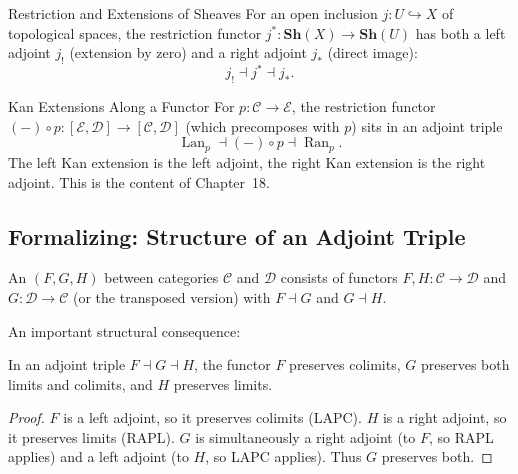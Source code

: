 \begin{example}{Restriction and Extensions of Sheaves}
For an open inclusion $j : U \hookrightarrow X$ of topological spaces, the
restriction functor $j^* : \mathbf{Sh}(X) \to \mathbf{Sh}(U)$ has both a left
adjoint $j_!$ (extension by zero) and a right adjoint $j_*$ (direct image):
\begin{equation*}
  j_! \dashv j^* \dashv j_*.
\end{equation*}
\end{example}

\begin{example}{Kan Extensions Along a Functor}
For $p : \mathcal{C} \to \mathcal{E}$, the restriction functor
$(-) \circ p : [\mathcal{E}, \mathcal{D}] \to [\mathcal{C}, \mathcal{D}]$ (which
precomposes with $p$) sits in an adjoint triple
\begin{equation*}
  \operatorname{Lan}_p \dashv (-) \circ p \dashv \operatorname{Ran}_p.
\end{equation*}
The left Kan extension is the left adjoint, the right Kan extension is the
right adjoint. This is the content of Chapter~18.
\end{example}

\subsection{Formalizing: Structure of an Adjoint Triple}

\begin{definition}
An  $(F, G, H)$ between categories $\mathcal{C}$ and
$\mathcal{D}$ consists of functors $F, H : \mathcal{C} \to \mathcal{D}$ and
$G : \mathcal{D} \to \mathcal{C}$ (or the transposed version) with $F \dashv G$
and $G \dashv H$.
\end{definition}

An important structural consequence:

\begin{proposition}
In an adjoint triple $F \dashv G \dashv H$, the functor $F$ preserves colimits,
$G$ preserves both limits and colimits, and $H$ preserves limits.
\end{proposition}

\begin{proof}
$F$ is a left adjoint, so it preserves colimits (LAPC). $H$ is a right adjoint,
so it preserves limits (RAPL). $G$ is simultaneously a right adjoint (to $F$,
so RAPL applies) and a left adjoint (to $H$, so LAPC applies). Thus $G$ preserves
both.
\end{proof}


